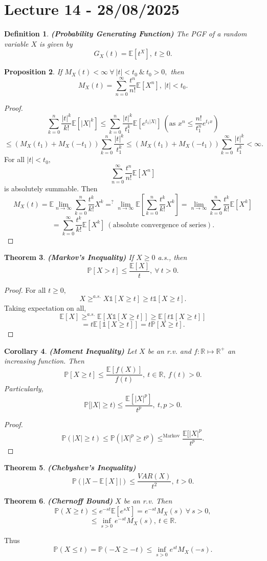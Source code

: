 \documentclass{article}
\newcommand{\1}{\mathds{1}}
\newcommand{\R}{\mathbb{R}}
\newcommand{\E}{\mathbb{E}}
\newcommand{\PB}{\mathbb{P}}
\newcommand{\lf}{\left}
\newcommand{\rg}{\right}
\newcommand{\f}[2]{\frac{#1}{#2}}
\newcommand{\fb}[1]{\lf(#1\rg)}
\newcommand{\tb}[1]{\lf[#1\rg]}
\newcommand{\card}[1]{\lf\vert #1\rg\vert}
\newcommand{\ar}{\ \&\ }
\newtheorem{theorem}{Theorem}[section]
\newtheorem{corollary}[theorem]{Corollary}
\newtheorem{proposition}[theorem]{Proposition}
\newtheorem{definition}[theorem]{Definition}
\begin{document}
\section{Lecture 14 - 28/08/2025}
\begin{definition}\textbf{(Probability Generating Function)}
    The PGF of a random variable $X$ is given by $$G_X(t)=\E[t^X],\ t\geq 0.$$
\end{definition}
\begin{proposition}
    If $M_X(t)<\infty\ \forall\ \card{t}<t_0\ar t_0>0,$ then $$M_X(t)=\sum_{n=0}^\infty \f{t^n}{n!}\E[X^n],\ \card{t}<t_0.$$
\end{proposition}
\begin{proof}
    $$\sum_{k=0}^n\f{\card{t}^k}{k!}\E[\card{X}^k]\leq \sum_{k=0}^n\f{\card{t}^k}{t_1^k}\E[e^{t_1\card{X}}]\ \fb{\text{as }x^n\leq \f{n!}{t_1^n}e^{t_1x}}$$ $$\leq (M_X(t_1)+M_X(-t_1))\sum_{k=0}^n\f{\card{t}^k}{t_1^k}\leq (M_X(t_1)+M_X(-t_1))\sum_{k=0}^\infty \f{\card{t}^k}{t_1^k}<\infty.$$
    For all $\card{t}<t_0,$ $$\sum_{n=0}^\infty \f{t^n}{n!}\E[X^n]$$ is absolutely summable. Then $$M_X(t)=\E\lim_{n\to\infty}\sum_{k=0}^n \f{t^k}{k!}X^k=^? \lim_{n\to\infty}\E\tb{\sum_{k=0}^n\f{t^k}{k!}X^k}=\lim_{n\to\infty}\sum_{k=0}^n\f{t^k}{k!}\E[X^k]$$
    $$=\sum_{k=0}^\infty \f{t^k}{k!}\E[X^k]\ (\text{absolute convergence of series}).$$
\end{proof}
\begin{theorem}\textbf{(Markov's Inequality)}
    If $X\geq 0$ a.s., then $$\PB[X>t]\leq \f{\E[X]}t,\ \forall\ t>0.$$
\end{theorem}
\begin{proof}
    For all $t\geq 0,$ $$X\geq^{a.s.}X\1[X\geq t]\geq t\1[X\geq t].$$ Taking expectation on all, $$\E[X]\geq^{a.s.}\E[X\1[X\geq t]]\geq \E[t\1[X\geq t]]$$ $$=t\E[\1[X\geq t]]=t\PB[X\geq t].$$
\end{proof}
\begin{corollary}\textbf{(Moment Inequality)}
    Let $X$ be an r.v. and $f:\R\mapsto\R^+$ an increasing function. Then $$\PB[X\geq t]\leq\f{\E[f(X)]}{f(t)},\ t\in\R,\ f(t)>0.$$ Particularly, $$\PB[\card{X}\geq t)\leq\f{\E[\card{X}^p]}{t^p},\ t,p>0.$$
\end{corollary}
\begin{proof}
    $$\PB(\card{X}\geq t)\leq \PB(\card{X}^p\geq t^p)\leq^{\text{Markov}}\f{\E[\card{X}^p}{t^p}.$$
\end{proof}
\begin{theorem}\textbf{(Chebyshev's Inequality)}
    $$\PB(\card{X-\E[X]})\leq \f{VAR(X)}{t^2},\ t>0.$$
\end{theorem}
\begin{theorem}\textbf{(Chernoff Bound)}
    $X$ be an r.v. Then $$\PB(X\geq t)\leq e^{-st}\E[e^{sX}]=e^{-st}M_X(s)\ \forall\ s>0,$$$$\leq \inf_{s>0}e^{-st}M_X(s),\ t\in\R.$$
\end{theorem}
Thus $$\PB(X\leq t)=\PB(-X\geq -t)\leq \inf_{s>0}e^{st}M_X(-s).$$
\end{document}
